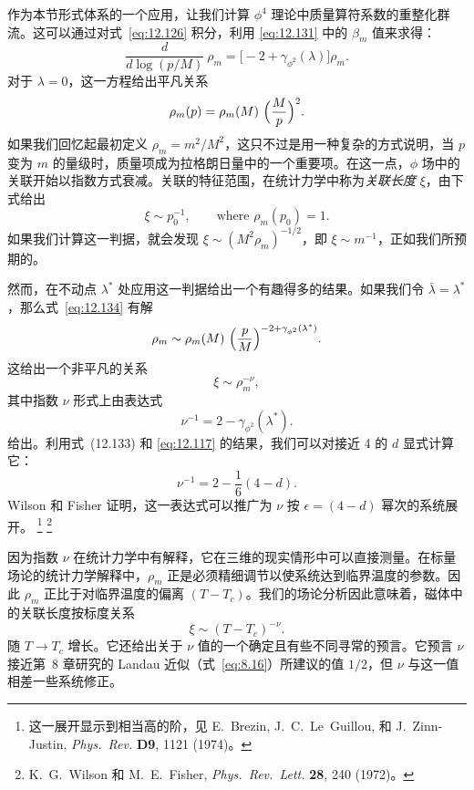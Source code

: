 作为本节形式体系的一个应用，让我们计算 $\phi^4$ 理论中质量算符系数的重整化群流。这可以通过对式~\eqref{eq:12.126} 积分，利用 \eqref{eq:12.131} 中的 $\beta_m$ 值来求得：
\begin{equation}
  \frac{d}{d\log(p/M)}\ \rho_m = \bigl[ -2 + \gamma_{\phi^2}(\lambda) \bigr]
    \rho_m .
  \label{eq:12.134}
\end{equation}
对于 $\lambda = 0$，这一方程给出平凡关系
\begin{equation}
  \rho_m(p) = \rho_m(M)\ \Bigl( \frac{M}{p} \Bigr)^2 .
  \label{eq:12.135}
\end{equation}
如果我们回忆起最初定义 $\rho_m = m^2/M^2$，这只不过是用一种复杂的方式说明，当 $p$ 变为 $m$ 的量级时，质量项成为拉格朗日量中的一个重要项。在这一点，$\phi$ 场中的关联开始以指数方式衰减。关联的特征范围，在统计力学中称为\emph{关联长度} $\xi$，由下式给出
\begin{equation}
  \xi \sim p_0^{-1},
  \qquad\text{where } \rho_m(p_0) = 1 .
  \label{eq:12.136}
\end{equation}
如果我们计算这一判据，就会发现 $\xi \sim (M^2\rho_m)^{-1/2}$，即 $\xi \sim m^{-1}$，正如我们所预期的。

然而，在不动点 $\lambda^{*}$ 处应用这一判据给出一个有趣得多的结果。如果我们令 $\bar{\lambda} = \lambda^{*}$，那么式~\eqref{eq:12.134} 有解
\begin{equation}
  \rho_m \sim \rho_m(M)\ \Bigl( \frac{p}{M} \Bigr)^{-2 +
    \gamma_{\phi^2}(\lambda^{*})} .
  \label{eq:12.137}
\end{equation}
这给出一个非平凡的关系
\begin{equation}
  \xi \sim \rho_m^{-\nu} ,
  \label{eq:12.138}
\end{equation}
其中指数 $\nu$ 形式上由表达式
\begin{equation}
  \nu^{-1} = 2 - \gamma_{\phi^2}(\lambda^{*}) .
  \label{eq:12.139}
\end{equation}
给出。利用式~(12.133) 和 \eqref{eq:12.117} 的结果，我们可以对接近 4 的 $d$ 显式计算它：
\begin{equation}
  \nu^{-1} = 2 - \frac{1}{6}(4-d) .
  \label{eq:12.140}
\end{equation}
Wilson 和 Fisher 证明，这一表达式可以推广为 $\nu$ 按 $\epsilon = (4-d)$ 幂次的系统展开。%
\footnote{这一展开显示到相当高的阶，见 E.~Brezin,
J.~C.~Le~Guillou, 和 J.~Zinn-Justin, \emph{Phys.\ Rev.} \textbf{D9}, 1121
(1974)。}%
\footnote{K.~G.~Wilson 和 M.~E.~Fisher, \emph{Phys.\ Rev.\ Lett.} \textbf{28},
240 (1972)。}

因为指数 $\nu$ 在统计力学中有解释，它在三维的现实情形中可以直接测量。在标量场论的统计力学解释中，$\rho_m$ 正是必须精细调节以使系统达到临界温度的参数。因此 $\rho_m$ 正比于对临界温度的偏离 $(T-T_c)$。我们的场论分析因此意味着，磁体中的关联长度按标度关系
\begin{equation}
  \xi \sim (T-T_c)^{-\nu} .
  \label{eq:12.141}
\end{equation}
随 $T\to T_c$ 增长。它还给出关于 $\nu$ 值的一个确定且有些不同寻常的预言。它预言 $\nu$ 接近第~8 章研究的 Landau 近似（式~\eqref{eq:8.16}）所建议的值 $1/2$，但 $\nu$ 与这一值相差一些系统修正。


